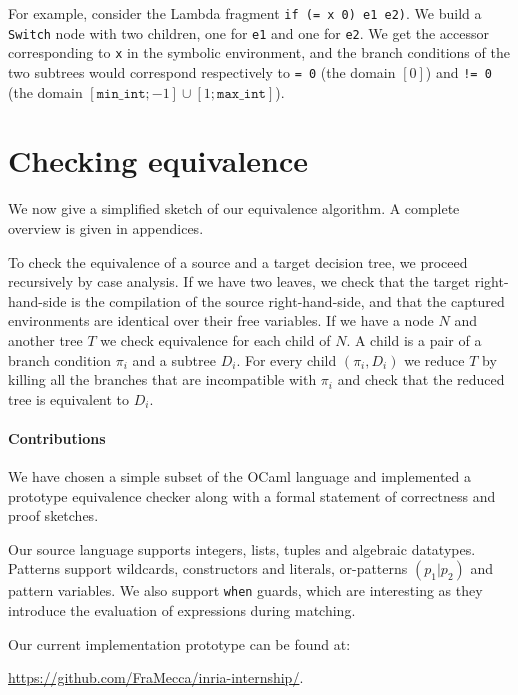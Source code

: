 \documentclass[12pt]{article}
\begin{document}
For example, consider the Lambda fragment
%
\lstinline{if (= x 0) e1 e2)}.
%
We build a \lstinline{Switch} node with two children, one for
\lstinline{e1} and one for \lstinline{e2}. We get the accessor
corresponding to \lstinline{x} in the symbolic environment, and the
branch conditions of the two subtrees would correspond respectively to
\lstinline{= 0} (the domain $[0]$) and \lstinline{!= 0} (the domain
$[\mathtt{min\_int}; -1] \cup [1; \mathtt{max\_int}]$).

\section{Checking equivalence}

We now give a simplified sketch of our equivalence
algorithm. A complete overview is given in appendices.

To check the equivalence of a source and a target decision tree,
we proceed recursively by case analysis.
%
If we have two leaves, we check that the target right-hand-side is the
compilation of the source right-hand-side, and that the captured
environments are identical over their free variables.
%
If we have a node $N$ and another tree $T$ we check equivalence for
each child of $N$. A child is a pair of a branch condition $\pi_i$ and a
subtree $D_i$. For every child $(\pi_i, D_i)$ we reduce $T$ by killing all
the branches that are incompatible with $\pi_i$ and check that the
reduced tree is equivalent to $D_i$.

\paragraph{Contributions} We have chosen a simple subset of the OCaml
language and implemented a prototype equivalence checker along with
a formal statement of correctness and proof sketches.

Our source language supports integers, lists, tuples and algebraic
datatypes. Patterns support wildcards, constructors and literals,
or-patterns $(p_1 | p_2)$ and pattern variables.  We also support
\texttt{when} guards, which are interesting as they introduce the
evaluation of expressions during matching.

Our current implementation prototype can be found at:
\begin{center}
  \url{https://github.com/FraMecca/inria-internship/}.
\end{center}

\appendix
\appendixpage
\end{document}
